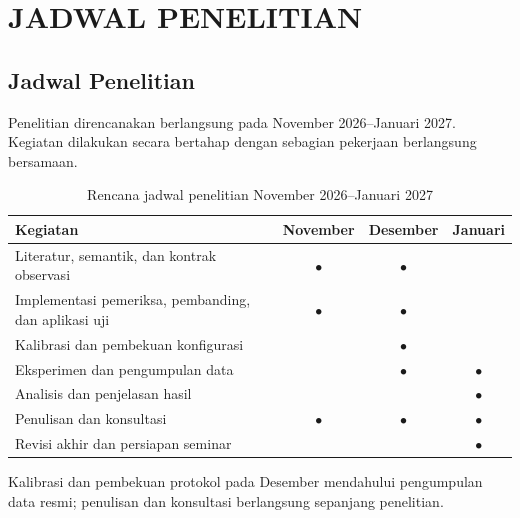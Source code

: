 \chapter{JADWAL PENELITIAN}

\section{Jadwal Penelitian}
Penelitian direncanakan berlangsung pada November 2026--Januari 2027. Kegiatan dilakukan secara bertahap dengan sebagian pekerjaan berlangsung bersamaan.

\begin{table}[H]
  \centering\small
  \caption{Rencana jadwal penelitian November 2026--Januari 2027}
  \label{tab:schedule}
  \begin{tabularx}{\textwidth}{@{}Xccc@{}}
    \toprule
    Kegiatan & November & Desember & Januari \\
    \midrule
    Literatur, semantik, dan kontrak observasi & $\bullet$ & $\bullet$ & \\
    Implementasi pemeriksa, pembanding, dan aplikasi uji & $\bullet$ & $\bullet$ & \\
    Kalibrasi dan pembekuan konfigurasi & & $\bullet$ & \\
    Eksperimen dan pengumpulan data & & $\bullet$ & $\bullet$ \\
    Analisis dan penjelasan hasil & & & $\bullet$ \\
    Penulisan dan konsultasi & $\bullet$ & $\bullet$ & $\bullet$ \\
    Revisi akhir dan persiapan seminar & & & $\bullet$ \\
    \bottomrule
  \end{tabularx}
\end{table}

Kalibrasi dan pembekuan protokol pada Desember mendahului pengumpulan data resmi; penulisan dan konsultasi berlangsung sepanjang penelitian.
